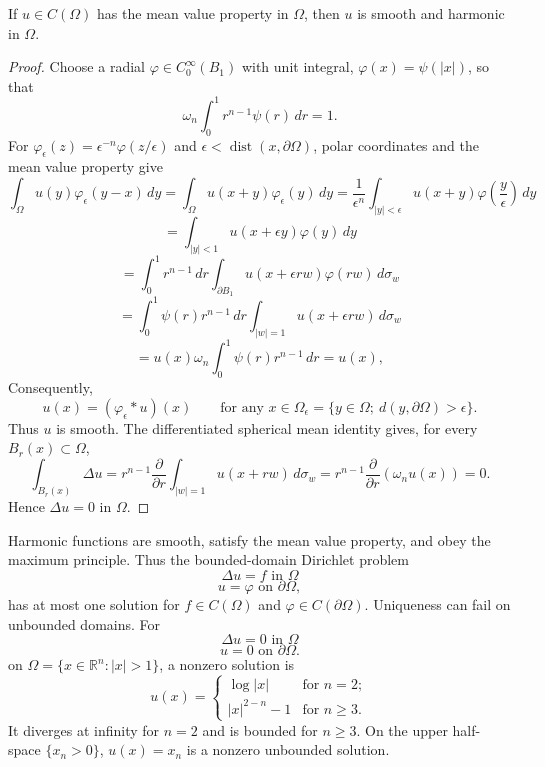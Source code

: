 \begin{theorem}\label{hanlin:thm-mean-value-harmonic}
If $u \in C(\Omega)$ has the mean value property in $\Omega$, then $u$ is smooth
and harmonic in $\Omega$.
\end{theorem}

\begin{proof}
\sketch Choose a radial $\varphi\in C_0^\infty(B_1)$ with unit integral,
$\varphi(x)=\psi(|x|)$, so that
\[
\omega_n \int_0^1 r^{n-1}\psi(r)\,dr = 1.
\]
For $\varphi_\epsilon(z)=\epsilon^{-n}\varphi(z/\epsilon)$ and
$\epsilon<\operatorname{dist}(x,\partial\Omega)$, polar coordinates and the
mean value property give
\[
\int_\Omega u(y)\varphi_\epsilon(y-x)\,dy
= \int_\Omega u(x+y)\varphi_\epsilon(y)\,dy
= \frac{1}{\epsilon^n}\int_{|y|<\epsilon} u(x+y)\varphi\!\left(\frac{y}{\epsilon}\right)\,dy
\]
\[
= \int_{|y|<1} u(x+\epsilon y)\varphi(y)\,dy
\]
\[
= \int_0^1 r^{n-1}\,dr \int_{\partial B_1} u(x+\epsilon rw)\varphi(rw)\,d\sigma_w
\]
\[
= \int_0^1 \psi(r)r^{n-1}\,dr \int_{|w|=1} u(x+\epsilon rw)\,d\sigma_w
\]
\[
= u(x)\omega_n \int_0^1 \psi(r)r^{n-1}\,dr = u(x),
\]
Consequently,
\[
u(x)=(\varphi_\epsilon * u)(x) \qquad \text{for any } x \in \Omega_\epsilon = \{y \in \Omega;\ d(y,\partial\Omega)>\epsilon\}.
\]
Thus $u$ is smooth. The differentiated spherical mean identity gives, for every
$B_r(x)\subset\Omega$,
\[
\int_{B_r(x)} \Delta u = r^{n-1}\frac{\partial}{\partial r}\int_{|w|=1} u(x+rw)\,d\sigma_w = r^{n-1}\frac{\partial}{\partial r}(\omega_n u(x)) = 0.
\]
Hence $\Delta u=0$ in $\Omega$.
\end{proof}

\begin{remark}\label{hanlin:remark-mvp-harmonic-smooth}
Harmonic functions are smooth, satisfy the mean value property, and obey the
maximum principle. Thus the bounded-domain Dirichlet problem
\[
\Delta u = f \text{ in } \Omega
\]
\[
u=\varphi \text{ on } \partial\Omega,
\]
has at most one solution for $f\in C(\Omega)$ and
$\varphi\in C(\partial\Omega)$. Uniqueness can fail on unbounded domains. For
\[
\Delta u = 0 \text{ in } \Omega
\]
\[
u=0 \text{ on } \partial\Omega.
\]
on $\Omega=\{x\in\mathbb{R}^n:|x|>1\}$, a nonzero solution is
\[
u(x)=
\begin{cases}
\log |x| & \text{for } n=2;\\
|x|^{2-n}-1 & \text{for } n\ge 3.
\end{cases}
\]
It diverges at infinity for $n=2$ and is bounded for $n\ge3$. On the upper
half-space $\{x_n>0\}$, $u(x)=x_n$ is a nonzero unbounded solution.
\end{remark}

